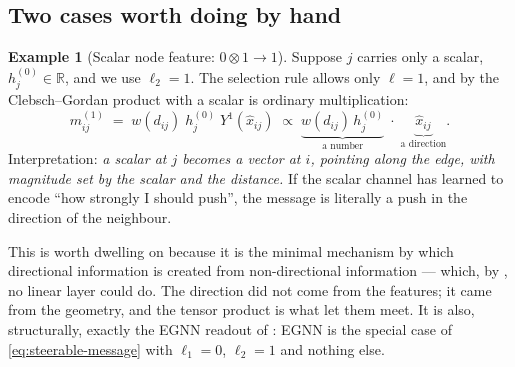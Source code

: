 \documentclass[11pt,a4paper]{report}
\theoremstyle{definition}
\newtheorem{example}[example]{Example}
\theoremstyle{remark}
\newcommand{\RR}{\mathbb R}
\begin{document}
\subsection{Two cases worth doing by hand}

\begin{example}[Scalar node feature: $0\otimes1\to1$]
\label{ex:message-scalar-node}
Suppose $j$ carries only a scalar, $h^{(0)}_j\in\RR$, and we use
$\ell_2=1$. The selection rule allows only $\ell=1$, and by
 the Clebsch--Gordan product with a scalar is ordinary
multiplication:
\[
m^{(1)}_{ij} \;=\; w(d_{ij})\;h^{(0)}_j\;Y^1(\hat x_{ij})
\;\propto\; \underbrace{w(d_{ij})\,h^{(0)}_j}_{\text{a number}}\;\cdot\;\underbrace{\hat x_{ij}}_{\text{a direction}} .
\]
Interpretation: \emph{a scalar at $j$ becomes a vector at $i$, pointing
along the edge, with magnitude set by the scalar and the distance.} If the
scalar channel has learned to encode ``how strongly I should push'', the
message is literally a push in the direction of the neighbour.

This is worth dwelling on because it is the minimal mechanism by which
directional information is created from non-directional information ---
which, by , no linear layer could do.
The direction did not come from the features; it came from the geometry, and
the tensor product is what let them meet. It is also, structurally, exactly
the EGNN readout of : EGNN is the special case of
\eqref{eq:steerable-message} with $\ell_1=0$, $\ell_2=1$ and nothing else.
\end{example}
\end{document}
